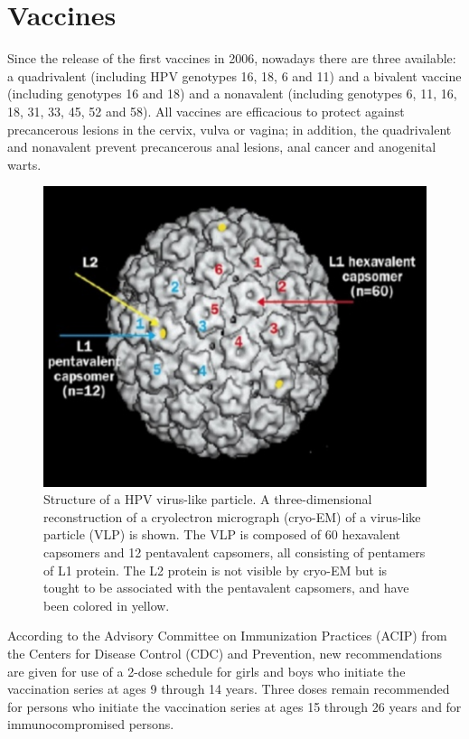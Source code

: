 \section{Vaccines}
Since the release of the first vaccines in 2006, nowadays there are three available: a quadrivalent (including HPV genotypes 16, 18, 6 and 11) and a bivalent vaccine (including genotypes 16 and 18) and a nonavalent (including genotypes 6, 11, 16, 18, 31, 33, 45, 52 and 58). All vaccines are efficacious to protect against precancerous lesions in the cervix, vulva or vagina; in addition, the quadrivalent and nonavalent prevent precancerous anal lesions, anal cancer and anogenital warts.

\begin{figure}[ht]
	\centering
\includegraphics[scale=0.7]{IMG/cryo.png}
\caption{Structure of a HPV virus-like particle. A three-dimensional reconstruction of a cryolectron micrograph (cryo-EM) of a virus-like particle (VLP) is shown. The VLP is composed of 60 hexavalent capsomers and 12 pentavalent capsomers, all consisting of pentamers of L1 protein. The L2 protein is not visible by cryo-EM but is tought to be associated with the pentavalent capsomers, and have been colored in yellow.}
\label{cryo}
\end{figure}  

According to the Advisory Committee on Immunization Practices (ACIP) from the Centers for Disease Control (CDC) and Prevention, new recommendations are given for use of a 2-dose schedule for girls and boys who initiate the vaccination series at ages 9 through 14 years. Three doses remain recommended for persons who initiate the vaccination series at ages 15 through 26 years and for immunocompromised persons.

